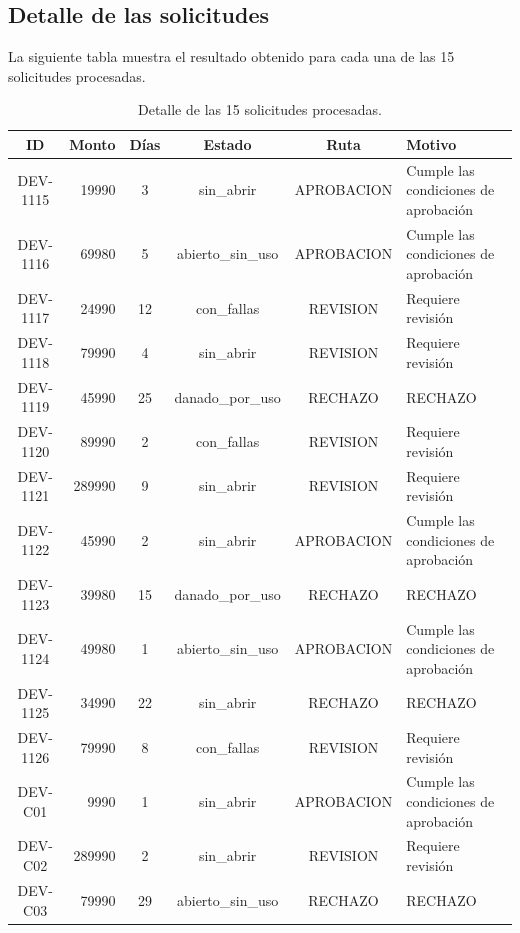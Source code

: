 \documentclass[11pt]{article}
\begin{document}
\subsection{Detalle de las solicitudes}

La siguiente tabla muestra el resultado obtenido para cada una de las 15 solicitudes procesadas.

\begin{table}[H]
\centering
\small
\caption{Detalle de las 15 solicitudes procesadas.}
\begin{tabular}{|c|r|c|c|c|l|}
\hline
\textbf{ID} & \textbf{Monto} & \textbf{Días} & \textbf{Estado} & \textbf{Ruta} & \textbf{Motivo} \\
\hline
DEV-1115 & 19990 & 3 & sin\_abrir & APROBACION & Cumple las condiciones de aprobación \\
\hline
DEV-1116 & 69980 & 5 & abierto\_sin\_uso & APROBACION & Cumple las condiciones de aprobación \\
\hline
DEV-1117 & 24990 & 12 & con\_fallas & REVISION & Requiere revisión \\
\hline
DEV-1118 & 79990 & 4 & sin\_abrir & REVISION & Requiere revisión \\
\hline
DEV-1119 & 45990 & 25 & danado\_por\_uso & RECHAZO & RECHAZO \\
\hline
DEV-1120 & 89990 & 2 & con\_fallas & REVISION & Requiere revisión \\
\hline
DEV-1121 & 289990 & 9 & sin\_abrir & REVISION & Requiere revisión \\
\hline
DEV-1122 & 45990 & 2 & sin\_abrir & APROBACION & Cumple las condiciones de aprobación \\
\hline
DEV-1123 & 39980 & 15 & danado\_por\_uso & RECHAZO & RECHAZO \\
\hline
DEV-1124 & 49980 & 1 & abierto\_sin\_uso & APROBACION & Cumple las condiciones de aprobación \\
\hline
DEV-1125 & 34990 & 22 & sin\_abrir & RECHAZO & RECHAZO \\
\hline
DEV-1126 & 79990 & 8 & con\_fallas & REVISION & Requiere revisión \\
\hline
DEV-C01 & 9990 & 1 & sin\_abrir & APROBACION & Cumple las condiciones de aprobación \\
\hline
DEV-C02 & 289990 & 2 & sin\_abrir & REVISION & Requiere revisión \\
\hline
DEV-C03 & 79990 & 29 & abierto\_sin\_uso & RECHAZO & RECHAZO \\
\hline
\end{tabular}
\end{table}
\end{document}
